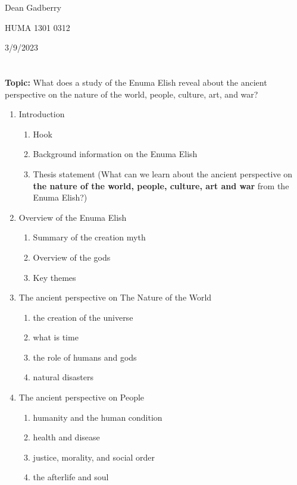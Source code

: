 \documentclass[12pt,a4paper,english]{article}
\begin{document}
\sloppy
Dean Gadberry
\par
HUMA 1301 0312
\par
3/9/2023

\section*{}
\textbf{Topic:}
What does a study of the Enuma Elish reveal about the ancient perspective on the nature of the world, people, culture, art, and war?
\begin{enumerate}
    \item Introduction
    \begin{enumerate}
        \item Hook
        \item Background information on the Enuma Elish
        \item Thesis statement (What can we learn about the ancient perspective on \textbf{the nature of the world, people, culture, art and war} from the Enuma Elish?)
    \end{enumerate}
    \item Overview of the Enuma Elish
      \begin{enumerate}
        \item Summary of the creation myth
        \item Overview of the gods 
        \item Key themes
      \end{enumerate}
    \item The ancient perspective on The Nature of the World
      \begin{enumerate}
        \item the creation of the universe
        \item what is time
        \item the role of humans and gods
        \item natural disasters
      \end{enumerate}
    \item The ancient perspective on People
      \begin{enumerate}
        \item humanity and the human condition
        \item health and disease
        \item justice, morality, and social order
        \item the afterlife and soul
      \end{enumerate}

\end{enumerate}
\end{document}

